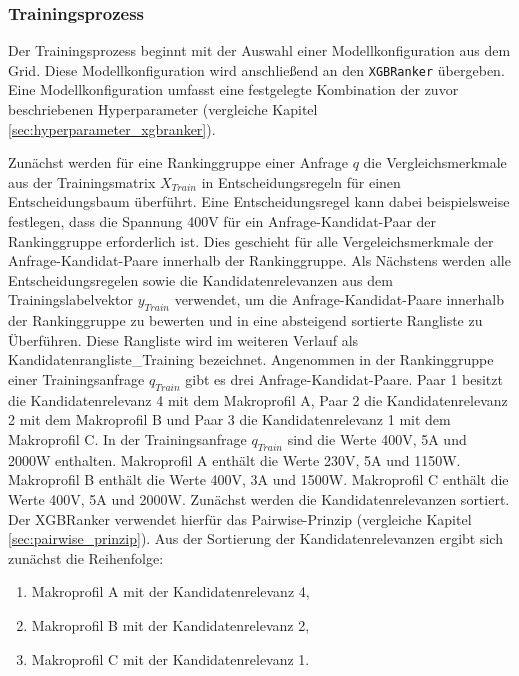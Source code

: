 \subsubsection{Trainingsprozess} 

Der Trainingsprozess beginnt mit der Auswahl einer Modellkonfiguration aus dem Grid.
Diese Modellkonfiguration wird anschließend an den \texttt{XGBRanker} übergeben. 
Eine Modellkonfiguration umfasst eine festgelegte Kombination der zuvor beschriebenen Hyperparameter (vergleiche Kapitel \ref{sec:hyperparameter_xgbranker}).

Zunächst werden für eine Rankinggruppe einer Anfrage \(q\) die Vergleichsmerkmale aus der Trainingsmatrix \(X_{Train}\) in Entscheidungsregeln für einen Entscheidungsbaum überführt.
Eine Entscheidungsregel kann dabei beispielsweise festlegen, dass die Spannung 400V für ein Anfrage-Kandidat-Paar der Rankinggruppe erforderlich ist. Dies geschieht für alle Vergeleichsmerkmale der Anfrage-Kandidat-Paare innerhalb der Rankinggruppe.
Als Nächstens werden alle Entscheidungsregelen sowie die Kandidatenrelevanzen aus dem Trainingslabelvektor \(y_{Train}\) verwendet, um die Anfrage-Kandidat-Paare innerhalb der Rankinggruppe zu bewerten und in eine absteigend sortierte Rangliste zu Überführen.
Diese Rangliste wird im weiteren Verlauf als Kandidatenrangliste\_Training bezeichnet.
Angenommen in der Rankinggruppe einer Trainingsanfrage \(q_{Train}\) gibt es drei Anfrage-Kandidat-Paare. Paar 1 besitzt die Kandidatenrelevanz 4 mit dem Makroprofil A, Paar 2 die Kandidatenrelevanz 2 mit dem Makroprofil B und Paar 3 die Kandidatenrelevanz 1 mit dem Makroprofil C.
In der Trainingsanfrage \(q_{Train}\) sind die Werte 400V, 5A und 2000W enthalten. Makroprofil A enthält die Werte 230V, 5A und 1150W. Makroprofil B enthält die Werte 400V, 3A und 1500W. Makroprofil C enthält die Werte 400V, 5A und 2000W.
Zunächst werden die Kandidatenrelevanzen sortiert. Der XGBRanker verwendet hierfür das Pairwise-Prinzip (vergleiche Kapitel \ref{sec:pairwise_prinzip}).
Aus der Sortierung der Kandidatenrelevanzen ergibt sich zunächst die Reihenfolge: 

\begin{enumerate} 
    \item Makroprofil A mit der Kandidatenrelevanz 4, 
    \item Makroprofil B mit der Kandidatenrelevanz 2, 
    \item Makroprofil C mit der Kandidatenrelevanz 1. 
\end{enumerate} 



